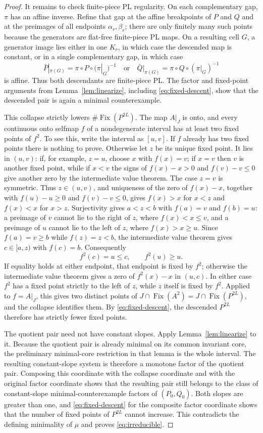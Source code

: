 \documentclass[11pt]{article}
\newcommand{\Fix}{\operatorname{Fix}}
\begin{document}
\begin{proof}
It remains to check finite-piece PL regularity. On each complementary gap, $\pi$ has an affine inverse.
Refine that gap at the affine breakpoints of $P$ and $Q$ and at the preimages of all endpoints
$\alpha_r,\beta_r$; there are only finitely many such points because the generators are flat-free
finite-piece PL maps. On a resulting cell $G$, a generator image lies either in one $K_r$, in which case
the descended map is constant, or in a single complementary gap, in which case
\[
\bar P|_{\pi(G)}=\pi\circ P\circ(\pi|_G)^{-1}
\quad\text{or}\quad
\bar Q|_{\pi(G)}=\pi\circ Q\circ(\pi|_G)^{-1}
\]
is affine. Thus both descendants are finite-piece PL. The factor and fixed-point arguments from
Lemma~\ref{lem:linearize}, including \eqref{eq:fixed-descent}, show that the descended pair is again a
minimal counterexample.

This collapse strictly lowers $\#\Fix(P^{2L})$. The map $A|_J$ is onto, and every continuous onto
selfmap $f$ of a nondegenerate interval has at least two fixed points of $f^2$. To see this, write the
interval as $[u,v]$. If $f$ already has two fixed points there is nothing to prove. Otherwise let $z$ be
its unique fixed point. It lies in $(u,v)$: if, for example, $z=u$, choose $x$ with $f(x)=v$;
if $x=v$ then $v$ is another fixed point, while if $x<v$ the signs of $f(x)-x>0$ and
$f(v)-v\le0$ give another zero by the intermediate value theorem. The case $z=v$ is symmetric.
Thus $z\in(u,v)$, and uniqueness of the zero of $f(x)-x$, together with
$f(u)-u\ge0$ and $f(v)-v\le0$, gives
$f(x)>x$ for $x<z$ and $f(x)<x$ for $x>z$. Surjectivity gives $a<z<b$ with $f(a)=v$ and $f(b)=u$: a preimage of $v$ cannot lie to the
right of $z$, where $f(x)<x\le v$, and a preimage of $u$ cannot lie to the left of $z$, where
$f(x)>x\ge u$. Since $f(a)=v\ge b$ while $f(z)=z<b$, the intermediate value theorem gives
$c\in[a,z)$ with $f(c)=b$. Consequently
\[
f^2(c)=u\le c,\qquad f^2(u)\ge u.
\]
If equality holds at either endpoint, that endpoint is fixed by $f^2$; otherwise the intermediate value
theorem gives a zero of $f^2(x)-x$ in $(u,c)$. In either case $f^2$ has a fixed point strictly to the
left of $z$, while $z$ itself is fixed by $f^2$. Applied to $f=A|_J$, this gives two distinct
points of $J\cap\Fix(A^2)=J\cap\Fix(P^{2L})$, and the collapse identifies them. By
\eqref{eq:fixed-descent}, the descended $P^{2L}$ therefore has strictly fewer fixed points.

The quotient pair need not have constant slopes. Apply Lemma~\ref{lem:linearize} to it. Because the
quotient pair is already minimal on its common invariant core, the preliminary minimal-core restriction
in that lemma is the whole interval. The resulting constant-slope system is therefore a monotone factor
of the quotient pair. Composing this coordinate with the collapse coordinate and with the original
factor coordinate shows that the resulting pair still belongs to the class of constant-slope
minimal-counterexample factors of $(P_0,Q_0)$. Both slopes are greater than one, and
\eqref{eq:fixed-descent} for the composite factor coordinate shows that the number of fixed points of
$P^{2L}$ cannot increase. This contradicts the defining minimality of $\mu$ and proves
\eqref{eq:irreducible}.
\end{proof}
\end{document}
